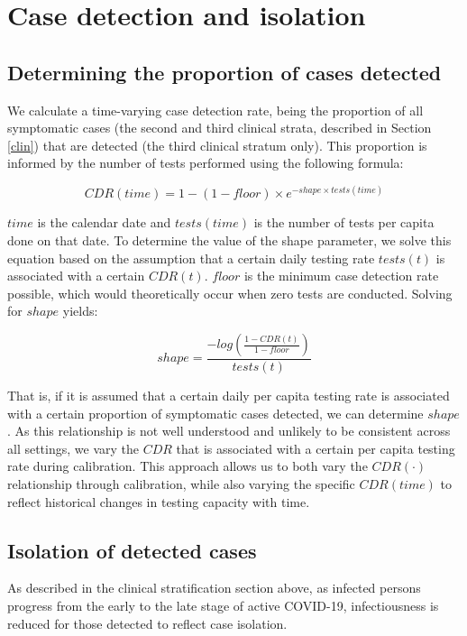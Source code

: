\section{Case detection and isolation} \label{cdr}

\subsection{Determining the proportion of cases detected}
We calculate a time-varying case detection rate, being the proportion of all symptomatic cases (the second and third clinical strata, described in Section \ref{clin}) that are detected (the third clinical stratum only).
This proportion is informed by the number of tests performed using the following formula:

\[CDR(time)=1-(1-floor)\times e^{-shape \times tests(time)}\]

$time$ is the calendar date and $tests(time)$ is the number of tests per capita done on that date. To determine the value of the shape parameter, we solve this equation based on the assumption that a certain daily testing rate $tests(t)$ is associated with a certain $CDR(t)$.
$floor$ is the minimum case detection rate possible, which would theoretically occur when zero tests are conducted.
Solving for $shape$ yields:

\[shape = \frac{-log(\frac{1 - CDR(t)}{1 - floor})}{tests(t)}\]

That is, if it is assumed that a certain daily per capita testing rate is associated with a certain proportion of symptomatic cases detected, we can determine $shape$.
As this relationship is not well understood and unlikely to be consistent across all settings, we vary the $CDR$ that is associated with a certain per capita testing rate during calibration.
This approach allows us to both vary the $CDR(\cdot)$ relationship through calibration,
while also varying the specific $CDR(time)$ to reflect historical changes in testing capacity with time.

\subsection{Isolation of detected cases}
As described in the clinical stratification section above, as infected persons progress from the early to the late stage of active COVID-19, 
infectiousness is reduced for those detected to reflect case isolation.
